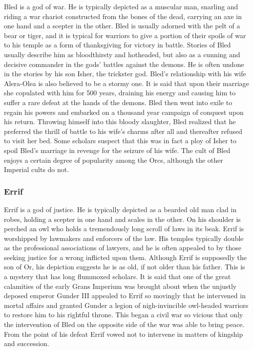 \documentclass[paper=a4, fontsize=11pt]{scrartcl} %
\begin{document}
\begin{multicols}{2}
Bled is a god of war. He is typically depicted as a muscular man, snarling and riding a war chariot constructed from the bones of the dead, carrying an axe in one hand and a scepter in the other. Bled is usually adorned with the pelt of a bear or tiger, and it is typical for warriors to give a portion of their spoils of war to his temple as a form of thanksgiving for victory in battle. Stories of Bled usually describe him as bloodthirsty and hotheaded, but also as a cunning and decisive commander in the gods' battles against the demons. He is often undone in the stories by his son Isher, the trickster god. Bled's relationship with his wife Alera-Olea is also believed to be a stormy one. It is said that upon their marriage she copulated with him for 500 years, draining his energy and causing him to suffer a rare defeat at the hands of the demons. Bled then went into exile to regain his powers and embarked on a thousand year campaign of conquest upon his return. Throwing himself into this bloody slaughter, Bled realized that he preferred the thrill of battle to his wife's charms after all and thereafter refused to visit her bed. Some scholars suspect that this was in fact a ploy of Isher to spoil Bled's marriage in revenge for the seizure of his wife. The cult of Bled enjoys a certain degree of popularity among the Orcs, although the other Imperial cults do not.

\subsubsection{Errif}

Errif is a god of justice. He is typically depicted as a bearded old man clad in robes, holding a scepter in one hand and scales in the other. On his shoulder is perched an owl who holds a tremendously long scroll of laws in its beak. Errif is worshipped by lawmakers and enforcers of the law. His temples typically double as the professional associations of lawyers, and he is often appealed to by those seeking justice for a wrong inflicted upon them. Although Errif is supposedly the son of Or, his depiction suggests he is as old, if not older than his father. This is a mystery that has long flummoxed scholars. It is said that one of the great calamities of the early Grans Imperium was brought about when the unjustly deposed emperor Gunder III appealed to Errif so movingly that he intervened in mortal affairs and granted Gunder a legion of nigh-invincible owl-headed warriors to restore him to his rightful throne. This began a civil war so vicious that only the intervention of Bled on the opposite side of the war was able to bring peace. From the point of his defeat Errif vowed not to intervene in matters of kingship and succession.


\end{multicols}
\end{document}
